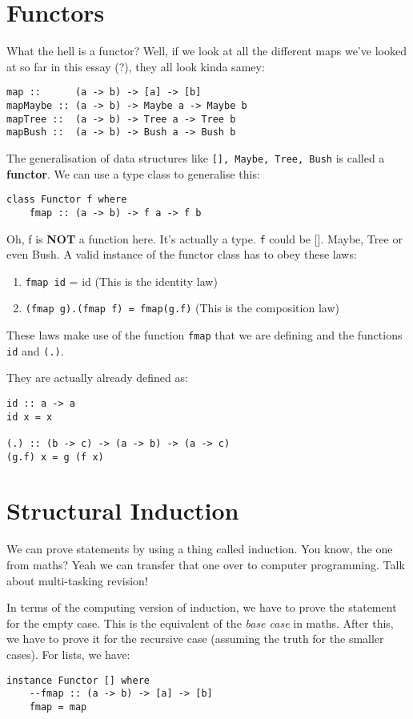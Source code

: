 \documentclass[11pt,a4paper,titlepage,dvipsnames,cmyk]{scrartcl}
\begin{document}
\section{Functors}%
\label{sec:Functors}
What the hell is a functor? Well, if we look at all the different maps
we've looked at so far in this essay (?), they all look kinda samey:
\begin{lstlisting}[style=B]
map ::      (a -> b) -> [a] -> [b]
mapMaybe :: (a -> b) -> Maybe a -> Maybe b
mapTree ::  (a -> b) -> Tree a -> Tree b
mapBush ::  (a -> b) -> Bush a -> Bush b
\end{lstlisting}

The generalisation of data structures like \lstinline|[], Maybe, Tree, Bush|
is called a \textbf{functor}. We can use a type class to generalise this:

\begin{lstlisting}[style=B]
class Functor f where
    fmap :: (a -> b) -> f a -> f b
\end{lstlisting}

Oh, f is \textbf{NOT} a function here. It's actually a type. \lstinline|f|
could be []. Maybe, Tree or even Bush. A valid instance of the functor
class has to obey these laws:
\begin{enumerate}
    \item \lstinline|fmap id| = id (This is the identity law)
    \item \lstinline|(fmap g).(fmap f) = fmap(g.f)| (This is the
        composition law)
\end{enumerate}

These laws make use of the function \lstinline|fmap| that we are defining
and the functions \lstinline|id| and \lstinline|(.)|.

They are actually already defined as:
\begin{lstlisting}[style=B]
id :: a -> a
id x = x

(.) :: (b -> c) -> (a -> b) -> (a -> c)
(g.f) x = g (f x)
\end{lstlisting}

\section{Structural Induction}%
\label{sec:induction}
We can prove statements by using a thing called induction. You know, the
one from maths? Yeah we can transfer that one over to computer
programming. Talk about multi-tasking revision!

In terms of the computing version of induction, we have to prove the
statement for the empty case. This is the equivalent of the \textit{base
case} in maths. After this, we have to prove it for the recursive case
(assuming the truth for the smaller cases). For lists, we have:
\begin{lstlisting}[style=B]
instance Functor [] where
    --fmap :: (a -> b) -> [a] -> [b]
    fmap = map
\end{lstlisting}
\end{document}
